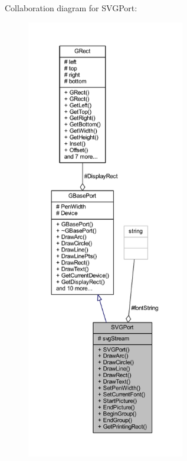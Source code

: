 Collaboration diagram for S\+V\+G\+Port\+:\nopagebreak
\begin{figure}[H]
\begin{center}
\leavevmode
\includegraphics[height=550pt]{class_s_v_g_port__coll__graph}
\end{center}
\end{figure}
